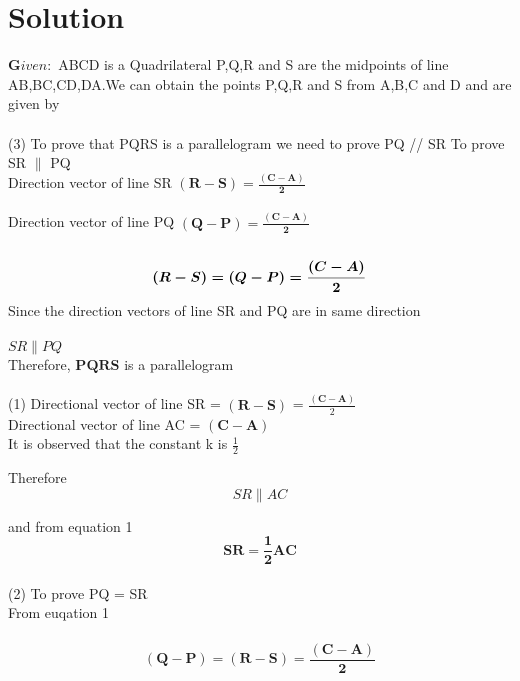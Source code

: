 \documentclass[journal,10pt,twocolumn]{article}
\begin{document}
{\section*{Solution}

$\boldsymbol Given :$  ABCD is a Quadrilateral P,Q,R and S are the midpoints of line AB,BC,CD,DA.We can obtain the points P,Q,R and S from A,B,C and D and are given by\\\\
\boldmath
\unboldmath
(3) To prove that PQRS is a parallelogram we need to prove  PQ // SR
To prove SR $\parallel$ PQ\\
Direction vector of line SR  $\boldsymbol {(R-S) =  \frac{(C-A)}{2}}$\\\\
Direction vector of line PQ  $\boldsymbol {(Q-P)= \frac{(C-A)}{2}}$\\\\
\begin{equation}
	\boldsymbol {(R-S) = (Q-P) = \frac{(C-A)}{2}}\\
\end{equation}
Since the direction vectors of line SR and PQ are in same direction\\\\
$SR \parallel PQ$\\
Therefore,
$\boldsymbol{ PQRS }$ is a parallelogram\\\\

	
(1)  Directional vector of line SR  = $\boldsymbol {(R-S)}$ = $\frac{\boldsymbol{(C-A)}}{2} $\\
Directional vector of line AC  = $\boldsymbol {(C-A)}$\\

It is observed that the constant k is $\frac{1}{2}$

Therefore
\begin{equation}
	SR \parallel AC
\end{equation} 

and from equation 1 
\begin{equation}
	\boldsymbol {SR = \frac{1}{2}AC}    
\end{equation}\\


(2)   To prove PQ = SR\\ 
		From euqation 1\\\\
\begin{equation}
		\boldsymbol{ (Q-P) = (R-S) = \frac{(C-A)}{2}}
\end{equation}
	 



}
\end{document}
